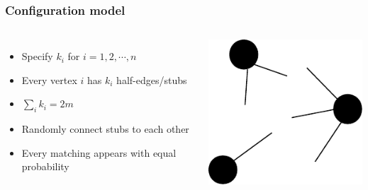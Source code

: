 \documentclass{beamer}
\begin{document}
\begin{frame}
    \frametitle{Configuration model}
    \begin{columns}
    \begin{itemize}
    \setlength\itemsep{1em}
        \item{Specify $k_i$ for $i=1, 2, \cdots, n$}
        \item{Every vertex $i$ has $k_i$ half-edges/stubs}
        \item{$\sum\limits_i k_i = 2m$}
        \item{Randomly connect stubs to each other}
        \item{Every matching appears with equal probability}
    \end{itemize}

    \centering
    \includegraphics[width=0.8\columnwidth]{configuration.pdf}
    \end{columns}
\end{frame}
\end{document}
